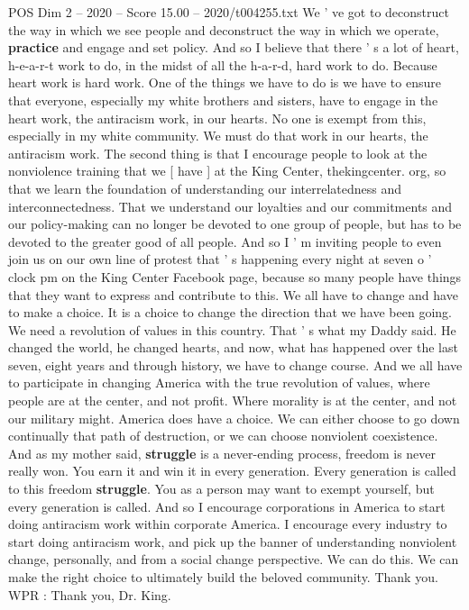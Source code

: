 \begin{textsample}{POS Dim 2 – 2020 – Score 15.00 – 2020/t004255.txt}
We ' ve got to deconstruct the way in which we see people and deconstruct the way in which we operate, \textbf{practice} and engage and set policy.
And so I believe that there ' s a lot of heart, h-e-a-r-t work to do, in the midst of all the h-a-r-d, hard work to do.
Because heart work is hard work.
One of the things we have to do is we have to ensure that everyone, especially my white brothers and sisters, have to engage in the heart work, the antiracism work, in our hearts.
No one is exempt from this, especially in my white community.
We must do that work in our hearts, the antiracism work.
The second thing is that I encourage people to look at the nonviolence training that we [ have ] at the King Center, thekingcenter. org, so that we learn the foundation of understanding our interrelatedness and interconnectedness.
That we understand our loyalties and our commitments and our policy-making can no longer be devoted to one group of people, but has to be devoted to the greater good of all people.
And so I ' m inviting people to even join us on our own line of protest that ' s happening every night at seven o ' clock pm on the King Center Facebook page, because so many people have things that they want to express and contribute to this.
We all have to change and have to make a choice.
It is a choice to change the direction that we have been going.
We need a revolution of values in this country.
That ' s what my Daddy said.
He changed the world, he changed hearts, and now, what has happened over the last seven, eight years and through history, we have to change course.
And we all have to participate in changing America with the true revolution of values, where people are at the center, and not profit.
Where morality is at the center, and not our military might.
America does have a choice.
We can either choose to go down continually that path of destruction, or we can choose nonviolent coexistence.
And as my mother said, \textbf{struggle} is a never-ending process, freedom is never really won.
You earn it and win it in every generation.
Every generation is called to this freedom \textbf{struggle}.
You as a person may want to exempt yourself, but every generation is called.
And so I encourage corporations in America to start doing antiracism work within corporate America.
I encourage every industry to start doing antiracism work, and pick up the banner of understanding nonviolent change, personally, and from a social change perspective.
We can do this.
We can make the right choice to ultimately build the beloved community.
Thank you.
WPR : Thank you, Dr.
King.

\end{textsample}

